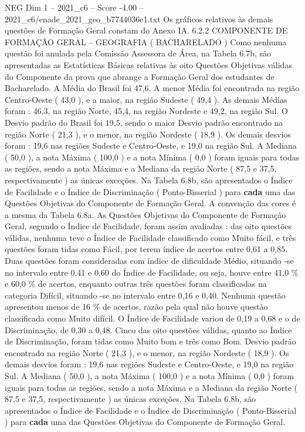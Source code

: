 \begin{textsample}{NEG Dim 1 – 2021\_c6 – Score -4.00 – 2021\_c6/enade\_2021\_geo\_b7744036e1.txt}
Os gráficos relativos às demais questões de Formação Geral constam do Anexo IA. 6.2.2 COMPONENTE DE FORMAÇÃO GERAL – GEOGRAFIA ( BACHARELADO ) Como nenhuma questão foi anulada pela Comissão Assessora de Área, na Tabela 6.7b, são apresentadas as Estatísticas Básicas relativas às oito Questões Objetivas válidas do Componente da prova que abrange a Formação Geral dos estudantes de Bacharelado.
A Média do Brasil foi 47,6.
A menor Média foi encontrada na região Centro-Oeste ( 43,0 ), e a maior, na região Sudeste ( 49,4 ).
As demais Médias foram : 46,3, na região Norte, 45,4, na região Nordeste e 49,2, na região Sul.
O Desvio padrão do Brasil foi 19,5, sendo o maior Desvio padrão encontrado na região Norte ( 21,3 ), e o menor, na região Nordeste ( 18,9 ).
Os demais desvios foram : 19,6 nas regiões Sudeste e Centro-Oeste, e 19,0 na região Sul.
A Mediana ( 50,0 ), a nota Máxima ( 100,0 ) e a nota Mínima ( 0,0 ) foram iguais para todas as regiões, sendo a nota Máxima e a Mediana da região Norte ( 87,5 e 37,5, respectivamente ) as únicas exceções.
Na Tabela 6.8b, são apresentados o Índice de Facilidade e o Índice de Discriminação ( Ponto-Bisserial ) para \textbf{cada} uma das Questões Objetivas do Componente de Formação Geral.
A convenção das cores é a mesma da Tabela 6.8a.
As Questões Objetivas do Componente de Formação Geral, segundo o Índice de Facilidade, foram assim avaliadas : das oito questões válidas, nenhuma teve o Índice de Facilidade classificado como Muito fácil, e três questões foram tidas como Fácil, por terem índice de acertos entre 0,61 a 0,85.
Duas questões foram consideradas com índice de dificuldade Médio, situando -se no intervalo entre 0,41 e 0,60 do Índice de Facilidade, ou seja, houve entre 41,0 \% e 60,0 \% de acertos, enquanto outras três questões foram classificadas na categoria Difícil, situando -se no intervalo entre 0,16 e 0,40.
Nenhuma questão apresentou menos de 16 \% de acertos, razão pela qual não houve questão classificada como Muito difícil.
O Índice de Facilidade variou de 0,19 a 0,68 e o de Discriminação, de 0,30 a 0,48.
Cinco das oito questões válidas, quanto ao Índice de Discriminação, foram tidas como Muito bom e três como Bom.
Desvio padrão encontrado na região Norte ( 21,3 ), e o menor, na região Nordeste ( 18,9 ).
Os demais desvios foram : 19,6 nas regiões Sudeste e Centro-Oeste, e 19,0 na região Sul.
A Mediana ( 50,0 ), a nota Máxima ( 100,0 ) e a nota Mínima ( 0,0 ) foram iguais para todas as regiões, sendo a nota Máxima e a Mediana da região Norte ( 87,5 e 37,5, respectivamente ) as únicas exceções.
Na Tabela 6.8b, são apresentados o Índice de Facilidade e o Índice de Discriminação ( Ponto-Bisserial ) para \textbf{cada} uma das Questões Objetivas do Componente de Formação Geral.

\end{textsample}
